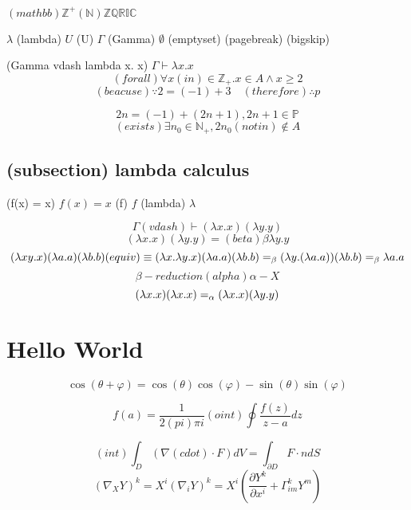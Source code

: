 \documentclass[11pt]{article}
\begin{document}
\begin{math}
(mathbb) \mathbb{Z^+} (\mathbb{N}) \mathbb{Z} \mathbb{Q} \mathbb{R} \mathbb{I} \mathbb{C}
\end{math}

$\lambda$ (lambda) $U$ (U) $\Gamma$ (Gamma) $\emptyset$ (emptyset) (pagebreak) (bigskip)

(Gamma vdash lambda x. x) $\Gamma \vdash \lambda x . x$ \\
$$(forall)\forall x(in)\in\mathbb{Z}_+. x\in{A} \wedge x\ge2$$
$$(beacuse)\because{2=(-1)+3} \quad(therefore)\therefore p$$

\begin{equation}
2n=(-1)+(2n+1),2n+1\in\mathbb{P}
\end{equation}
\begin{equation}
(exists)\exists{n_0}\in\mathbb{N}_+,2n_0(notin)\notin{A}
\end{equation}

\subsection{(subsection) lambda calculus}

(f(x) = x) $f(x) = x$ (f) $f$ (lambda) $\lambda$

$$\Gamma (vdash)\vdash (\lambda x . x) (\lambda y . y)$$
$$(\lambda x . x) (\lambda y . y) = (beta)\beta \lambda y . y$$
$$ (\lambda xy.x) (\lambda a.a) (\lambda b.b) (equiv)\equiv (\lambda x.\lambda y.x) (\lambda a.a) (\lambda b.b) \\ = _\beta (\lambda y.(\lambda a.a)) (\lambda b.b) \\ = _\beta \lambda a.a $$
$$\beta-reduction (alpha)\alpha-X$$
$$ (\lambda x . x) (\lambda x . x) \\ = _\alpha (\lambda x . x) (\lambda y . y) $$

\section{Hello World}

\begin{equation}
\cos(θ+φ)=\cos(θ)\cos(φ)−\sin(θ)\sin(φ)
\end{equation}

\begin{equation}
f(a) = \frac{1}{2(pi)\pi i} (oint)\oint\frac{f(z)}{z-a}dz
\end{equation}

\begin{equation}
(int)\int_D ({\nabla(cdot)\cdot} F)dV=\int_{\partial D} F\cdot ndS
\end{equation}
\begin{equation}
(\nabla_X Y)^k = X^i (\nabla_i Y)^k = X^i \left( \frac{\partial Y^k}{\partial x^i} + \Gamma_{im}^k Y^m \right)
\end{equation}
\end{document}
